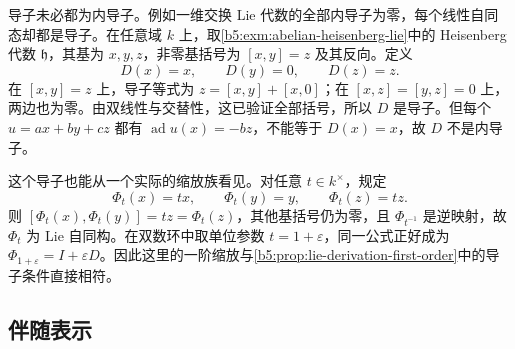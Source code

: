 导子未必都为内导子。例如一维交换 Lie 代数的全部内导子为零，每个线性自同态却都是导子。在任意域 \(k\) 上，取\cref{b5:exm:abelian-heisenberg-lie}中的 Heisenberg 代数 \(\mathfrak h\)，其基为 \(x,y,z\)，非零基括号为 \([x,y]=z\) 及其反向。定义
\[
	D(x)=x,\qquad D(y)=0,\qquad D(z)=z.
\]
在 \([x,y]=z\) 上，导子等式为 \(z=[x,y]+[x,0]\)；在 \([x,z]=[y,z]=0\) 上，两边也为零。由双线性与交替性，这已验证全部括号，所以 \(D\) 是导子。但每个 \(u=ax+by+cz\) 都有 \(\operatorname{ad}u(x)=-bz\)，不能等于 \(D(x)=x\)，故 \(D\) 不是内导子。

\ProseParagraphBreak

这个导子也能从一个实际的缩放族看见。对任意 \(t\in k^\times\)，规定
\[
	\Phi_t(x)=tx,\qquad \Phi_t(y)=y,\qquad \Phi_t(z)=tz.
\]
则 \([\Phi_t(x),\Phi_t(y)]=tz=\Phi_t(z)\)，其他基括号仍为零，且 \(\Phi_{t^{-1}}\) 是逆映射，故 \(\Phi_t\) 为 Lie 自同构。在双数环中取单位参数 \(t=1+\varepsilon\)，同一公式正好成为 \(\Phi_{1+\varepsilon}=I+\varepsilon D\)。因此这里的一阶缩放与\cref{b5:prop:lie-derivation-first-order}中的导子条件直接相符。

\subsection{伴随表示}
\label{b5:subsec:1102:03}

